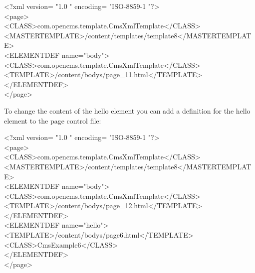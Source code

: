 \begin{xml}
<?xml version= "1.0 " encoding= "ISO-8859-1 "?>\\
<page>\\
\xtaba <CLASS>com.opencms.template.CmsXmlTemplate</CLASS>\\
\xtaba <MASTERTEMPLATE>/content/templates/template8</MASTERTEMPLATE>\\
\xtaba <ELEMENTDEF name="body">\\
\xtaba <CLASS>com.opencms.template.CmsXmlTemplate</CLASS>\\
\xtaba <TEMPLATE>/content/bodys/page\_11.html</TEMPLATE>\\
\xtaba </ELEMENTDEF>\\
</page>\\
\end{xml}

To change the content of the {\name hello} element you can add a definition
for the  {\name hello} element to the page control file:

\begin{xml}
<?xml version= "1.0 " encoding= "ISO-8859-1 "?>\\
<page>\\
\xtaba <CLASS>com.opencms.template.CmsXmlTemplate</CLASS>\\
\xtaba <MASTERTEMPLATE>/content/templates/template8</MASTERTEMPLATE>\\
\xtaba <ELEMENTDEF name="body">\\
\xtaba <CLASS>com.opencms.template.CmsXmlTemplate</CLASS>\\
\xtaba <TEMPLATE>/content/bodys/page\_12.html</TEMPLATE>\\
\xtaba </ELEMENTDEF>\\
\xtaba <ELEMENTDEF name="hello">\\
\xtaba <TEMPLATE>/content/bodys/page6.html</TEMPLATE>\\
\xtaba <CLASS>CmsExample6</CLASS>\\
\xtaba </ELEMENTDEF>\\

</page>\\
\end{xml}

